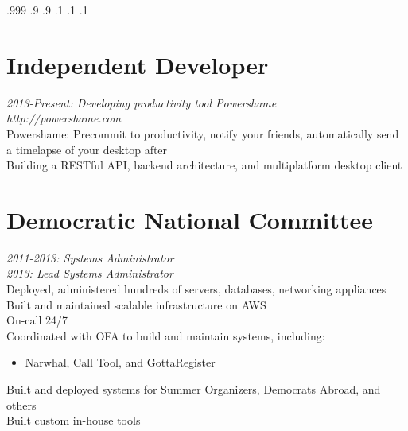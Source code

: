 \documentclass[9pt]{res} %
\begin{document}

\moveleft.999\hoffset{}  
\moveleft.9\hoffset{}
\moveleft.9\hoffset{}
\vspace{-14mm}
\moveright.1\hoffset{}
\moveright.1\hoffset{}
\moveright.1\hoffset{}
\begin{resume}

\section{Independent Developer} 

{\sl 2013-Present: Developing productivity tool Powershame  } \\
{\sl http://powershame.com } \\
{Powershame: Precommit to productivity, notify your friends, automatically send a timelapse of your desktop after}\\
{Building a RESTful API, backend architecture, and multiplatform desktop client} \\
\section{Democratic National Committee} 

{\sl 2011-2013: Systems Administrator} \\
{\sl 2013: Lead Systems Administrator} \\
Deployed, administered hundreds of servers, databases, networking appliances \\
Built and maintained scalable infrastructure on AWS \\
On-call 24/7 \\
Coordinated with OFA to build and maintain systems, including:
\begin{itemize} \item Narwhal, Call Tool, and GottaRegister \end{itemize}
\vspace{-4mm}
Built and deployed systems for Summer Organizers, Democrats Abroad, and others \\
Built custom in-house tools \\



\end{resume}
\end{document}
